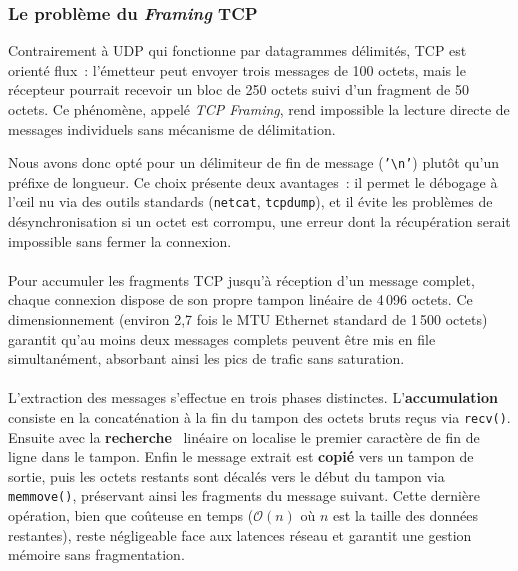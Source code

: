 \documentclass[a4paper]{article}
\begin{document}
\subsubsection{Le problème du \textit{Framing} TCP}
\label{subsec:tcp-framing}
 
Contrairement à UDP qui fonctionne par datagrammes délimités, TCP est orienté
flux~: l'émetteur peut envoyer trois messages de 100 octets, mais le récepteur
pourrait recevoir un bloc de 250 octets suivi d'un fragment de 50 octets. Ce
phénomène, appelé \textit{TCP Framing}, rend impossible la lecture directe de
messages individuels sans mécanisme de délimitation.
 

Nous avons donc opté pour un délimiteur de fin de message (\texttt{'\textbackslash{}n'})
plutôt qu'un préfixe de longueur. Ce choix présente deux avantages~:
il permet le débogage à l'œil nu via des outils standards (\texttt{netcat},
\texttt{tcpdump}), et il évite les problèmes de désynchronisation si un octet est corrompu, une erreur dont la récupération serait impossible
sans fermer la connexion.
 
\paragraph{}
Pour accumuler les fragments TCP jusqu'à réception d'un message complet, chaque
connexion dispose de son propre tampon linéaire de 4\,096 octets. Ce
dimensionnement (environ 2,7 fois le MTU Ethernet standard de 1\,500 octets)
garantit qu'au moins deux messages complets peuvent être mis en file
simultanément, absorbant ainsi les pics de trafic sans saturation.
 
\paragraph{}
L'extraction des messages s'effectue en trois phases distinctes. L'\textbf{accumulation}~  consiste en la concaténation à la fin du tampon des octets bruts reçus via
\texttt{recv()}. Ensuite avec la
\textbf{recherche}~ linéaire on localise le premier caractère
de fin de ligne dans le tampon. Enfin
le message extrait est \textbf{copié} vers un tampon de sortie, puis les octets restants
sont décalés vers le début du tampon via \texttt{memmove()}, préservant ainsi
les fragments du message suivant. Cette dernière opération, bien que coûteuse
en temps ($\mathcal{O}(n)$ où $n$ est la taille des données restantes), reste
négligeable face aux latences réseau et garantit une gestion mémoire sans
fragmentation.
\end{document}
